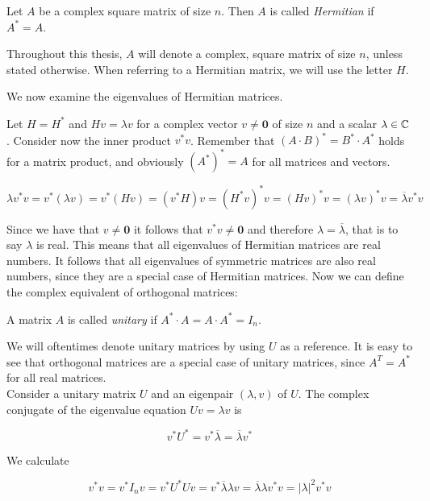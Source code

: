 \begin{definition}
    Let $A$ be a complex square matrix of size $n$.
    Then $A$ is called \emph{Hermitian} if $A^* = A$.
\end{definition}

Throughout this thesis, $A$ will denote a complex, square matrix of size $n$, unless stated otherwise.
When referring to a Hermitian matrix, we will use the letter $H$.

We now examine the eigenvalues of Hermitian matrices.

Let $H = H^*$ and $H v = \lambda v$ for a complex vector $v \neq \mathbf{0}$ of size $n$ and a scalar $\lambda \in \mathbb{C}$.
Consider now the inner product $ v^* v$.
Remember that $(A \cdot B)^* = B^* \cdot A^*$ holds for a matrix product,
and obviously ${(A^*)^*} = A$ for all matrices and vectors.

\[
    \lambda v^* v = v^* \left( \lambda v \right)
    = v^* \left( H v \right)
    = \left(v^* H \right) v
    = \left( H^* v \right)^* v
    = \left( H v \right)^* v
    = (\lambda v)^* v
    = \overline{\lambda} v^* v
\]

Since we have that $v \neq \mathbf{0}$ it follows that $v^* v \neq \mathbf{0}$
and therefore $\lambda = \overline{\lambda}$, that is to say $\lambda$ is real.
This means that all eigenvalues of Hermitian matrices are real numbers.
It follows that all eigenvalues of symmetric matrices are also real numbers,
since they are a special case of Hermitian matrices.
Now we can define the complex equivalent of orthogonal matrices:

\begin{definition}
    A matrix $A$ is called \emph{unitary} if $A^* \cdot A = A \cdot A^* = I_n$.
\end{definition}

We will oftentimes denote unitary matrices by using $U$ as a reference.
It is easy to see that orthogonal matrices are a special case of unitary matrices,
since $A^T = A^*$ for all real matrices.\\
Consider a unitary matrix $U$ and an eigenpair $(\lambda, v)$ of $U$.
The complex conjugate of the eigenvalue equation $U v = \lambda v$ is

\[
    v^* U^* = v^* \overline{\lambda} = \overline{\lambda} v^*
\]

We calculate

\[
    v^* v = v^* I_n v = v^* U^* U v = v^* \overline{\lambda} \lambda v = \overline{\lambda} \lambda v^* v = \left| \lambda \right|^2 v^* v
\]

